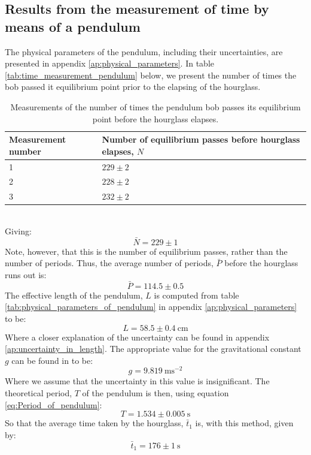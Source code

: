 \documentclass[a4paper, 10pt]{article}
\begin{document}
\subsection{Results from the measurement of time by means of a pendulum}\label{results_pendulum_length}
The physical parameters of the pendulum, including their uncertainties, are presented in appendix \ref{ap:physical_parameters}. In table \ref{tab:time_measurement_pendulum} below, we present the number of times the bob passed it equilibrium point prior to the elapsing of the hourglass.\\
\linebreak
\linebreak
\label{tab:time_measurement_pendulum}
\begin{table}[ht!]
\centering
\caption{Measurements of the number of times the pendulum bob passes its equilibrium point before the hourglass elapses.}
\begin{tabular}{|l|l|}
\hline
\textbf{Measurement number}                              & \textbf{Number of equilibrium passes before hourglass elapses, $N$}             \\
\hline
1                                  & $229\pm 2$  \\
2		                            & $228 \pm 2$    \\
3									 & $232 \pm 2$   \\

\hline 
\end{tabular}
\end{table}\\
Giving:
$$\bar{N}=229\pm 1$$
Note, however, that this is the number of equilibrium passes, rather than the number of periods. Thus, the average number of periods, $\bar{P}$ before the hourglass runs out is:
$$\bar{P}=114.5 \pm 0.5$$
The effective length of the pendulum, $L$ is computed from table \ref{tab:physical_parameters_of_pendulum} in appendix \ref{ap:physical_parameters} to be:
$$L=58.5 \pm 0.4 \ \mathrm{cm}$$
Where a closer explanation of the uncertainty can be found in appendix \ref{ap:uncertainty_in_length}. The appropriate value for the gravitational constant $g$ can be found in \cite{gravity} to be:
$$g = 9.819\ \mathrm{m s^{-2}}$$
Where we assume that the uncertainty in this value is insignificant. 
The theoretical period, $T$ of the pendulum is then, using equation \ref{eq:Period_of_pendulum}:
$$T=1.534 \pm 0.005 \ \mathrm{s}$$
So that the average time taken by the hourglass, $\bar{t}_1$ is, with this method, given by:
$$\bar{t}_1=176 \pm 1\ \mathrm{s}$$
\end{document}
